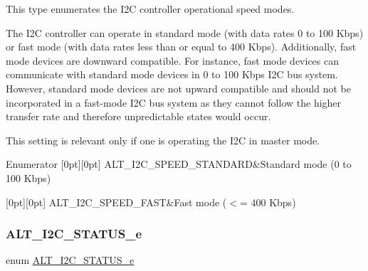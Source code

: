 This type enumerates the I2C controller operational speed modes.

The I2C controller can operate in standard mode (with data rates 0 to 100 Kbps) or fast mode (with data rates less than or equal to 400 Kbps). Additionally, fast mode devices are downward compatible. For instance, fast mode devices can communicate with standard mode devices in 0 to 100 Kbps I2C bus system. However, standard mode devices are not upward compatible and should not be incorporated in a fast-\/mode I2C bus system as they cannot follow the higher transfer rate and therefore unpredictable states would occur.

This setting is relevant only if one is operating the I2C in master mode. \begin{DoxyEnumFields}{Enumerator}
[0pt][0pt]{}\mbox{\label{group__ALT__I2C_ggad65b1b276561735ec5613ae1b1a000b7a2e0a7aa944c0bafa0f02d474c672a6ab}} 
A\+L\+T\+\_\+\+I2\+C\+\_\+\+S\+P\+E\+E\+D\+\_\+\+S\+T\+A\+N\+D\+A\+RD&Standard mode (0 to 100 Kbps) \\
\hline

[0pt][0pt]{}\mbox{\label{group__ALT__I2C_ggad65b1b276561735ec5613ae1b1a000b7a2981a6ba7691f5c26d60a5aa00bf5466}} 
A\+L\+T\+\_\+\+I2\+C\+\_\+\+S\+P\+E\+E\+D\+\_\+\+F\+A\+ST&Fast mode ($<$= 400 Kbps) \\
\hline

\end{DoxyEnumFields}
\mbox{\label{group__ALT__I2C_ga229c6d995595615ca923ecc8b6490603}} 
\subsubsection{\texorpdfstring{ALT\_I2C\_STATUS\_e}{ALT\_I2C\_STATUS\_e}}
{\footnotesize\ttfamily enum \mbox{\hyperlink{group__ALT__I2C_ga229c6d995595615ca923ecc8b6490603}{A\+L\+T\+\_\+\+I2\+C\+\_\+\+S\+T\+A\+T\+U\+S\+\_\+e}}}

